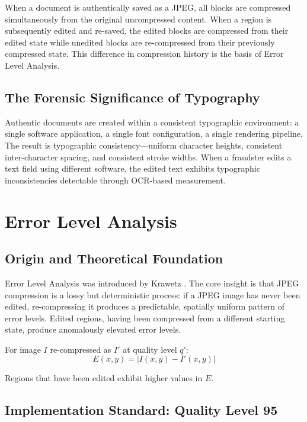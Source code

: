 \documentclass[12pt,a4paper,oneside]{report}
\begin{document}
When a document is authentically saved as a JPEG, all blocks are compressed
simultaneously from the original uncompressed content. When a region is
subsequently edited and re-saved, the edited blocks are compressed from their
edited state while unedited blocks are re-compressed from their previously
compressed state. This difference in compression history is the basis of
Error Level Analysis.

\subsection{The Forensic Significance of Typography}

Authentic documents are created within a consistent typographic environment:
a single software application, a single font configuration, a single rendering
pipeline. The result is typographic consistency---uniform character heights,
consistent inter-character spacing, and consistent stroke widths. When a
fraudster edits a text field using different software, the edited text exhibits
typographic inconsistencies detectable through OCR-based measurement.

\section{Error Level Analysis}
\label{sec:ela_lit}

\subsection{Origin and Theoretical Foundation}

Error Level Analysis was introduced by Krawetz \cite{krawetz2007}. The core
insight is that JPEG compression is a lossy but deterministic process: if a
JPEG image has never been edited, re-compressing it produces a predictable,
spatially uniform pattern of error levels. Edited regions, having been
compressed from a different starting state, produce anomalously elevated
error levels.

For image $I$ re-compressed as $I'$ at quality level $q'$:
\[E(x,y) = |I(x,y) - I'(x,y)|\]

Regions that have been edited exhibit higher values in $E$.

\subsection{Implementation Standard: Quality Level 95}
\end{document}
